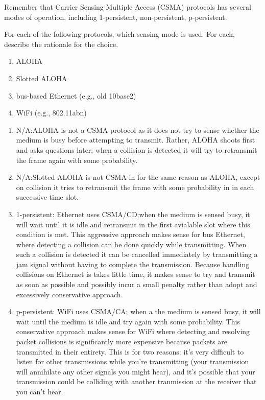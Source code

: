 \documentclass{report}
\begin{document}
\clearpage
\begin{problem}

Remember that Carrier Sensing Multiple Access (CSMA) protocols has several modes
of operation, including 1-persistent, non-persistent, p-persistent.

For each of the following protocols, which sensing mode is used.  For each,
describe the rationale for the choice.

\begin{enumerate}
\item ALOHA
\item Slotted ALOHA
\item bus-based Ethernet (e.g., old 10base2)
\item WiFi (e.g., 802.11abn)
\end{enumerate}

\begin{answer}{45em}
  \begin{enumerate}
    \item N/A:\@ ALOHA is not a CSMA protocol as it does not try to sense whether
          the medium is busy before attempting to transmit. Rather, ALOHA shoots
          first and asks questions later; when a collision is detected it will
          try to retransmit the frame again with some probability.

    \item N/A:\@ Slotted ALOHA is not CSMA in for the same reason as ALOHA, except
          on collision it tries to retransmit the frame with some probability in
          in each successive time slot.

    \item 1-persistent: Ethernet uses CSMA/CD;\@ when the medium is sensed busy,
          it will wait until it is idle and retransmit in the first avialable
          slot where this condition is met. This aggressive approach makes sense
          for bus Ethernet, where detecting a collision can be done quickly
          while transmitting. When such a collision is detected it can be
          cancelled immediately by transmitting a jam signal without having to
          complete the transmission. Because handling collisions on Ethernet is
          takes little time, it makes sense to try and transmit as soon as
          possible and possibly incur a small penalty rather than adopt and
          excessively conservative approach.

    \item p-persistent: WiFi uses CSMA/CA; when a the medium is sensed busy,
          it will wait until the medium is idle and try again with some
          probability. This conservative approach makes sense for WiFi where
          detecting and resolving packet collisions is significantly more
          expensive because packets are transmitted in their entirety. This is
          for two reasons: it's very difficult to listen for other transmissions
          while you're transmitting (your transmission will annihilate any other
          signals you might hear), and it's possible that your transmission
          could be colliding with another tranmission at the receiver that you
          can't hear.


\end{enumerate}
\end{answer}
\end{problem}
\end{document}
